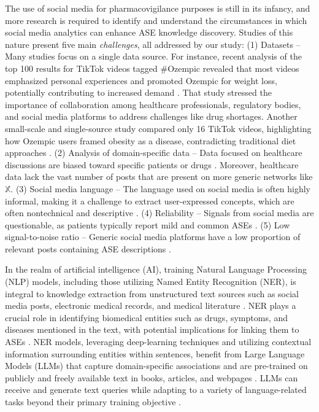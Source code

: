 \documentclass[referee,bst/sn-basic]{sn-jnl}%
\theoremstyle{thmstyletwo}%
\theoremstyle{thmstylethree}%
\begin{document}
The use of social media for pharmacovigilance purposes is still in its infancy, and more research is required \cite{golder2023role,lee2021use,lee2021use,golder2023role} to identify and understand the circumstances in which social media analytics can enhance ASE knowledge discovery. 
Studies of this nature present five main \textit{challenges}, all  addressed by our study:
(1) Datasets -- Many studies focus on a single data source.
    For instance, recent analysis of the top 100 results for TikTok videos tagged \#Ozempic revealed that most videos emphasized personal experiences and promoted Ozempic for weight loss, potentially contributing to increased demand \cite{basch2023descriptive}. 
    That study stressed the importance of collaboration among healthcare professionals, regulatory bodies, and social media platforms to address challenges like drug shortages. 
    Another small-scale and single-source study compared only 16 TikTok videos, highlighting how Ozempic users framed obesity as a disease, contradicting traditional diet approaches \cite{lennon2023can}.
(2)
    Analysis of domain-specific data -- Data focused on healthcare discussions are biased toward specific patients or drugs \cite{golder2023role}. 
    Moreover, healthcare data lack the vast number of posts that are present on more generic networks like $\mathbb{X}$.
(3)
    Social media language -- The language used on social media is often highly informal, making it a challenge to extract user-expressed concepts, which are often nontechnical and descriptive \cite{sarker2015portable}.
(4)
     Reliability -- Signals from social media are questionable, as patients typically report mild and common ASEs \cite{lee2021use,golder2023role}.
(5)
    Low signal-to-noise ratio -- Generic social media platforms have a low proportion of relevant posts containing ASE descriptions \cite{lee2021use}.

In the realm of artificial intelligence (AI), training Natural Language Processing (NLP) models, including those utilizing Named Entity Recognition (NER), is integral to knowledge extraction from unstructured text sources such as social media posts, electronic medical records, and medical literature \cite{ekbal2013bio,xie2021unveiling}.
NER plays a crucial role in identifying biomedical entities such as drugs, symptoms, and diseases mentioned in the text, with potential implications for linking them to ASEs \cite{tarcar2019healthcare,xie2021unveiling,ekbal2013bio}. 
NER models, leveraging deep-learning techniques \cite{li2020survey} 
and utilizing contextual information surrounding entities within sentences, benefit from Large Language Models (LLMs) that capture domain-specific associations and are pre-trained on publicly and freely available text in books, articles, and webpages \cite{sciencefocus-gpt3}.
LLMs can receive and generate text queries while adapting to a variety of language-related tasks beyond their primary training objective \cite{omiye2024large}.
\end{document}
